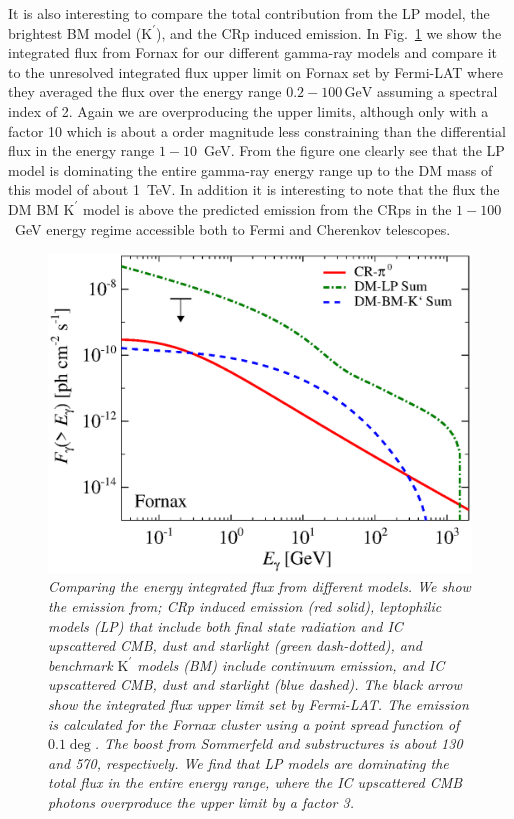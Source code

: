 \documentclass[10pt,aps,pra,reprint,amsmath,amsfonts,amssymb,showpacs]{revtex4-1}
\newcommand{\rmn}{\mathrm}
\newcommand{\Kp}{\rmn{K}^\prime}
\newcommand{\gev}{\rmn{GeV}}
\begin{document}
It is also interesting to compare the total contribution from the LP
model, the brightest BM model ($\Kp$), and the CRp induced emission. In
Fig.~\ref{fig:flux_int} we show the integrated flux from Fornax for
our different gamma-ray models and compare it to the unresolved
integrated flux upper limit on Fornax set by Fermi-LAT where they
averaged the flux over the energy range $0.2-100\,\gev$ assuming a
spectral index of 2. Again we are overproducing the upper limits,
although only with a factor 10 which is about a order magnitude less
constraining than the differential flux in the energy range
$1-10$~GeV. From the figure one clearly see that the LP model is
dominating the entire gamma-ray energy range up to the DM mass of this
model of about 1~TeV. In addition it is interesting to note that the
flux the DM BM $\Kp$ model is above the predicted emission from the
CRps in the $1-100$~GeV energy regime accessible both to Fermi and
Cherenkov telescopes.

\begin{figure}
 \includegraphics[width=0.99\columnwidth]{figures/flux.int.v9.0.1deg.1.6T.SubMass.SF300.IR2.noMW.woGal.eps}
\caption{\it Comparing the energy integrated flux from different
  models. We show the emission from; CRp induced emission (red solid),
  leptophilic models (LP) that include both final state radiation and
  IC upscattered CMB, dust and starlight (green dash-dotted), and
  benchmark $\Kp$ models (BM) include continuum emission, and IC
  upscattered CMB, dust and starlight (blue dashed). The black arrow
  show the integrated flux upper limit set by Fermi-LAT. The emission
  is calculated for the Fornax cluster using a point spread function
  of $0.1\deg$. The boost from Sommerfeld and substructures is about
  130 and 570, respectively. We find that LP models are dominating the
  total flux in the entire energy range, where the IC upscattered CMB
  photons overproduce the upper limit by a factor 3.}
 \label{fig:flux_int}
\end{figure}
\end{document}
